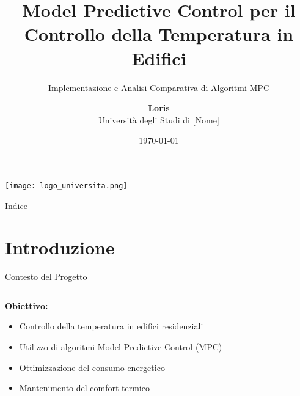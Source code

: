\documentclass[beamer]{beamer}
\title[Progetto MPC - Controllo Temperatura]{Model Predictive Control per il Controllo della Temperatura in Edifici}
\subtitle{Implementazione e Analisi Comparativa di Algoritmi MPC}
\author[Loris]{\textbf{Loris} \\ Università degli Studi di [Nome]}
\institute[Dipartimento di Ingegneria]{Dipartimento di Ingegneria dell'Informazione}
\date{\today}
\begin{document}
\begin{frame}
    \titlepage
    \begin{center}
        \texttt{[image: logo\_universita.png]}
    \end{center}
\end{frame}

\begin{frame}{Indice}
    \tableofcontents
\end{frame}

\section{Introduzione}

\begin{frame}{Contesto del Progetto}
    \begin{columns}
        \begin{column}{0.6\textwidth}
            \textbf{Obiettivo:}
            \begin{itemize}
                \item Controllo della temperatura in edifici residenziali
                \item Utilizzo di algoritmi Model Predictive Control (MPC)
                \item Ottimizzazione del consumo energetico
                \item Mantenimento del comfort termico
            \end{itemize}
        \end{column}
        \begin{column}{0.4\textwidth}
        \end{column}
    \end{columns}
\end{frame}
\end{document}
